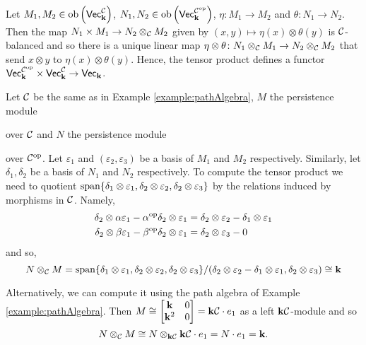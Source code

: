 Let $M_1,M_2\in\operatorname{ob}\left(\normalfont\mathsf{Vec}_{\mathbf{k}}^{\mathcal{C}}\right)$, $N_1,N_2\in\operatorname{ob}\left(\normalfont\mathsf{Vec}_{\mathbf{k}}^{\mathcal{C}^{\text{op}}}\right)$, $\eta\colon M_1\to M_2$ and $\theta\colon N_1\to N_2$. 
Then the map $N_1\times M_1\to N_2\otimes_{\mathcal{C}} M_2$ given by $(x,y)\mapsto \eta(x)\otimes \theta(y)$ is $\mathcal{C}$-balanced and so there is a unique linear map $\eta\otimes \theta\colon N_1\otimes_{\mathcal{C}} M_1\to N_2\otimes_{\mathcal{C}} M_2$ that send $x\otimes y$ to $\eta(x)\otimes \theta(y)$.
Hence, the tensor product defines a functor $\normalfont\mathsf{Vec}_{\mathbf{k}}^{\mathcal{C}^{\text{op}}}\times \normalfont\mathsf{Vec}_{\mathbf{k}}^{\mathcal{C}}\to\normalfont\mathsf{Vec}_{\mathbf{k}}$.

\begin{example}\label{example:tensorProduct}
   Let $\mathcal{C}$ be the same as in Example \ref{example:pathAlgebra},
   $M$ the persistence module
   \begin{center}
   \end{center}
   over $\mathcal{C}$ and $N$ the persistence module
   \begin{center}
   \end{center}
   over $\mathcal{C}^{\text{op}}$. 
   Let $\varepsilon_1$ and  $(\varepsilon_2, \varepsilon_3)$ be a basis of $M_1$ and $M_2$ respectively.
   Similarly, let $\delta_1, \delta_2$ be a basis of $N_1$ and $N_2$ respectively.
   To compute the tensor product we need to quotient $\operatorname{span}\{\delta_1\otimes\varepsilon_1,\delta_2\otimes\varepsilon_2,\delta_2\otimes\varepsilon_3\}$ by the relations induced by morphisms in $\mathcal{C}$.
   Namely,
   \begin{align*}
    \delta_2\otimes\alpha\varepsilon_1-\alpha^{\text{op}}\delta_2\otimes\varepsilon_1&=\delta_2\otimes\varepsilon_2-\delta_1\otimes\varepsilon_1\\
    \delta_2\otimes\beta\varepsilon_1-\beta^{\text{op}}\delta_2\otimes\varepsilon_1&=\delta_2\otimes\varepsilon_3-0
   \end{align*}
   and so,
   \[ N\otimes_{\mathcal{C}} M=\operatorname{span}\{\delta_1\otimes\varepsilon_1,\delta_2\otimes\varepsilon_2,\delta_2\otimes\varepsilon_3\}/(\delta_2\otimes\varepsilon_2-\delta_1\otimes\varepsilon_1,\delta_2\otimes\varepsilon_3)\cong\mathbf{k} \]
   
   Alternatively, we can compute it using the path algebra of Example \ref{example:pathAlgebra}.
   Then $M\cong\begin{bmatrix}\mathbf{k}&0\\\mathbf{k}^2&0\end{bmatrix}=\mathbf{k}\mathcal{C}\cdot e_1$ as a left $\mathbf{k}\mathcal{C}$-module and so
   \[ N\otimes_{\mathcal{C}} M\cong N\otimes_{\mathbf{k}\mathcal{C}} \mathbf{k}\mathcal{C}\cdot e_1=N\cdot e_1=\mathbf{k}. \]
\end{example}
